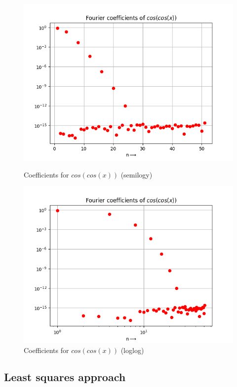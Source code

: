 \documentclass[12pt, a4paper]{article}
\begin{document}
\begin{figure}[H]
\centering
\includegraphics[scale=0.75]{Figure_11.png}
\caption{Coefficients for $cos(cos(x))$ (semilogy)}
\centering
\includegraphics[scale=0.75]{Figure_12.png}
\caption{Coefficients for $cos(cos(x))$ (loglog)}
\end{figure}
 

 
\subsection{Least squares approach}
\end{document}
